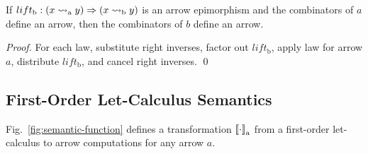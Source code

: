 \documentclass{llncs}
\newcommand{\figref}[1]{Fig.~\ref{#1}}
\newcommand{\arrow}{\rightsquigarrow}
\newcommand{\arrowlift}{\ensuremath{lift}}
\newcommand{\gen}{_\mathrm{a}}
\newcommand{\genb}{_\mathrm{b}}
\begin{document}
\begin{theorem}
\label{thm:arrow-epimorphism}
If $\arrowlift\genb : (x \arrow\gen y) \tto (x \arrow\genb y)$ is an arrow epimorphism and the combinators of $a$ define an arrow, then the combinators of $b$ define an arrow.
\end{theorem}
\begin{proof}
For each law, substitute right inverses, factor out $\arrowlift\genb$, apply law for arrow $a$, distribute $\arrowlift\genb$, and cancel right inverses.
\qed
\end{proof}



\subsection{First-Order Let-Calculus Semantics}

\figref{fig:semantic-function} defines a transformation $\meaningof{\cdot}\gen$ from a first-order let-calculus to arrow computations for any arrow $a$.
\end{document}
